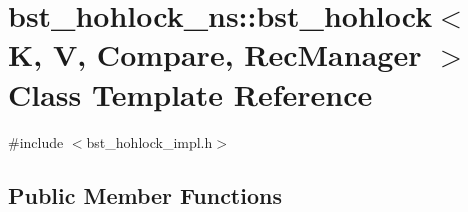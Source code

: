\hypertarget{classbst__hohlock__ns_1_1bst__hohlock}{}\section{bst\+\_\+hohlock\+\_\+ns\+:\+:bst\+\_\+hohlock$<$ K, V, Compare, Rec\+Manager $>$ Class Template Reference}
\label{classbst__hohlock__ns_1_1bst__hohlock}


{\ttfamily \#include $<$bst\+\_\+hohlock\+\_\+impl.\+h$>$}

\subsection*{Public Member Functions}
